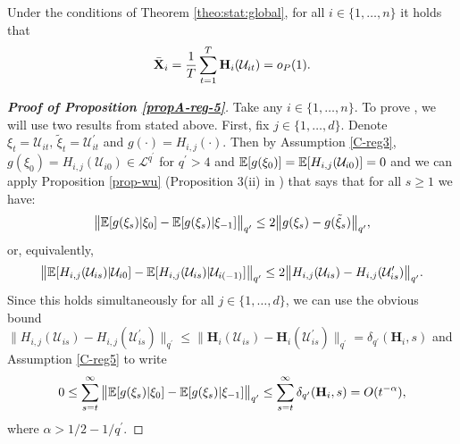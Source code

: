 \documentclass[a4paper,12pt]{article}
\makeatletter
\renewcommand{\eqref}[1]{\tagform@{\ref{#1}}}
\makeatother
\begin{document}
\begin{propA}\label{propA-reg-5}
Under the conditions of Theorem \ref{theo:stat:global}, for all $i \in \{1, \ldots, n\}$ it holds that
\begin{align}\label{eqA:regs}
\bar{\mathbf{X}}_i = \frac{1}{T}\sum_{t=1}^T \mathbf{H}_i (\mathcal{U}_{it}) = o_P(1).
\end{align}
\end{propA}
\begin{proof}[\textnormal{\textbf{Proof of Proposition \ref{propA-reg-5}}}] 

Take any $i \in \{1, \ldots, n\}$. To prove \eqref{eqA:regs}, we will use two results from \cite*{Wu2007} stated above. First, fix $j \in \{1, \ldots, d\}$. Denote $\xi_t = \mathcal{U}_{it},\, \tilde{\xi}_t = \mathcal{U}^\prime_{it}$ and $g(\cdot) = H_{i,j}(\cdot)$. Then by Assumption \ref{C-reg3}, $g(\xi_0) = H_{i, j}(\mathcal{U}_{i0}) \in \mathcal{L}^{q^\prime}$ for $q^\prime > 4$ and $\mathbb{E}[g(\xi_0)] = \mathbb{E}[H_{i, j}(\mathcal{U}_{i0})] = 0$ and we can apply Proposition \ref{prop-wu} (Proposition 3(ii) in \linebreak \cite{Wu2007}) that says that for all $s \geq 1$ we have:
\begin{align*}
\big\lVert \mathbb{E} [g(\xi_s)| \xi_0] - \mathbb{E} [g(\xi_s)| \xi_{-1}]\big\rVert_{q^\prime} \leq 2 \big\lVert g(\xi_s) - g(\tilde{\xi}_s)\big\rVert_{q^\prime},
\end{align*}
or, equivalently,
\begin{align*}
\big\lVert \mathbb{E} [H_{i, j}(\mathcal{U}_{is})| \mathcal{U}_{i0}] - \mathbb{E} [H_{i, j}(\mathcal{U}_{is})| \mathcal{U}_{i(-1)}]\big\rVert_{q^\prime} \leq 2 \big\lVert H_{i, j}(\mathcal{U}_{is}) - H_{i, j}(\mathcal{U}_{is}^\prime)\big\rVert_{q^\prime}.
\end{align*}
Since this holds simultaneously for all $j \in \{1, \ldots, d\}$, we can use the obvious bound $\big\lVert H_{i, j}(\mathcal{U}_{is}) - H_{i, j}(\mathcal{U}_{is}^\prime)\big\rVert_{q^\prime} \leq \big\lVert \mathbf{H}_{i}(\mathcal{U}_{is}) - \mathbf{H}_{i}(\mathcal{U}_{is}^\prime)\big\rVert_{q^\prime} = \delta_{q^\prime}(\mathbf{H}_i, s)$ and Assumption \ref{C-reg5} to write 
\begin{align*}
0 \leq \sum_{s = t}^\infty\big\lVert \mathbb{E} [g(\xi_s)| \xi_0] - \mathbb{E} [g(\xi_s)| \xi_{-1}]\big\rVert_{q^\prime} \leq \sum_{s = t}^\infty \delta_{q^\prime}(\mathbf{H}_i, s) =O(t^{-\alpha}),
\end{align*}
where $\alpha > 1/2 - 1/{q^\prime}$.


\end{proof}
\end{document}
